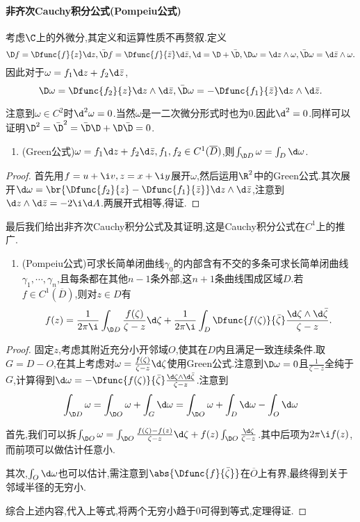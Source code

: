 \documentclass{article}
\begin{document}
\paragraph{非齐次Cauchy积分公式(Pompeiu公式)}
考虑$\C$上的外微分,其定义和运算性质不再赘叙.定义$$\D f=\Dfunc{f}{z}\d z,\bar{\D}f=\Dfunc{f}{\bar{z}}\d \bar{z},\d=\D+\bar{\D},\D \omega=\d z\wedge\omega,\bar{\D}\omega=\d\bar{z}\wedge\omega.$$
因此对于$\omega=f_1\d z+f_2\d\bar{z}$, $$\D\omega=\Dfunc{f_2}{z}\d z\wedge\d\bar{z}, \bar{\D}\omega=-\Dfunc{f_1}{\bar{z}}\d z\wedge\d\bar{z}.$$

注意到$\omega\in C^2$时$\d^2\omega=0$.当然$\omega$是一二次微分形式时也为0.因此$\d^2=0$.同样可以证明$\D^2=\bar{\D}^2=\bar{\D}\D+\D\bar{\D}=0$.

\begin{enumerate}[resume]
    \item (Green公式)$\omega=f_1\d z+f_2\d \bar{z},f_1,f_2\in C^1(\overline{D})$,则$\int_{\D D}\omega=\int_D \d\omega$.
\end{enumerate}

\begin{proof}
    首先用$f=u+\i v,z=x+\i y$展开$\omega$,然后运用$\R^2$中的Green公式.其次展开$\d\omega=\br{\Dfunc{f_2}{z}-\Dfunc{f_1}{\bar{z}}}\d z\wedge\d\bar{z}$,注意到$\d z\wedge\d\bar{z}=-2\i\d A$.两展开式相等,得证.
\end{proof}

最后我们给出非齐次Cauchy积分公式及其证明,这是Cauchy积分公式在$C^1$上的推广.

\begin{enumerate}[resume]
    \item (Pompeiu公式)可求长简单闭曲线$\gamma_0$的内部含有不交的多条可求长简单闭曲线$\gamma_1,\cdots,\gamma_n$,且每条都在其他$n-1$条外部,这$n+1$条曲线围成区域$D$.若$f\in C^1(\overline{D})$,则对$z\in D$有$$f(z)=\frac{1}{2\pi\i}\int_{\D D}\frac{f(\zeta)}{\zeta-z}\d\zeta+\frac{1}{2\pi\i}\int_D \Dfunc{f(\zeta)}{\bar{\zeta}}\frac{\d\zeta\wedge\d\bar{\zeta}}{\zeta-z}.$$
\end{enumerate}

\begin{proof}
    固定$z$,考虑其附近充分小开邻域$O$,使其在$D$内且满足一致连续条件.取$G=D-O$,在其上考虑对$\omega=\frac{f(\zeta)}{\zeta-z}\d\zeta$使用Green公式.注意到$\D\omega=0$且$\frac{1}{\zeta-z}$全纯于$G$,计算得到$\d\omega=-\Dfunc{f(\zeta)}{\bar{\zeta}}\frac{\d\zeta\wedge\d\bar{\zeta}}{\zeta-z}$.注意到
    $$\int_{\D D}\omega=\int_{\D O}\omega+\int_G \d\omega=\int_{\D O}\omega+\int_D \d\omega-\int_O \d\omega$$

    首先,我们可以拆$\int_{\D O}\omega=\int_{\D O}\frac{f(\zeta)-f(z)}{\zeta-z}\d\zeta+f(z)\int_{\D O}\frac{\d\zeta}{\zeta-z}$.其中后项为$2\pi\i f(z)$,而前项可以做估计任意小.

    其次,$\int_O\d\omega$也可以估计,需注意到$\abs{\Dfunc{f}{\bar{\zeta}}}$在$\overline{O}$上有界,最终得到关于邻域半径的无穷小.

    综合上述内容,代入上等式,将两个无穷小趋于0可得到等式,定理得证.
\end{proof}
\end{document}
